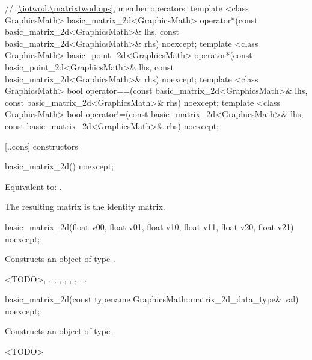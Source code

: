 \begin{codeblock}
{  // \ref{\iotwod.\matrixtwod.ops}, member operators:
  template <class GraphicsMath>
  basic_matrix_2d<GraphicsMath> operator*(const basic_matrix_2d<GraphicsMath>& lhs,
    const basic_matrix_2d<GraphicsMath>& rhs) noexcept;
  template <class GraphicsMath>
  basic_point_2d<GraphicsMath> operator*(const basic_point_2d<GraphicsMath>& lhs,
    const basic_matrix_2d<GraphicsMath>& rhs) noexcept;
  template <class GraphicsMath>
  bool operator==(const basic_matrix_2d<GraphicsMath>& lhs,
    const basic_matrix_2d<GraphicsMath>& rhs) noexcept;
  template <class GraphicsMath>
  bool operator!=(const basic_matrix_2d<GraphicsMath>& lhs,
    const basic_matrix_2d<GraphicsMath>& rhs) noexcept;
}
\end{codeblock}

 [\iotwod.\matrixtwod.cons] { constructors}

%
\begin{itemdecl}
basic_matrix_2d() noexcept;
\end{itemdecl}
\begin{itemdescr}
\pnum
\effects
Equivalent to: .

\pnum
\begin{note}
The resulting matrix is the identity matrix.
\end{note}
\end{itemdescr}

%
\begin{itemdecl}
basic_matrix_2d(float v00, float v01, float v10, float v11,
  float v20, float v21) noexcept;
\end{itemdecl}
\begin{itemdescr}
\pnum
\effects
Constructs an object of type .

\pnum
<TODO>, , , , , , , , .
\end{itemdescr}

%
\begin{itemdecl}
basic_matrix_2d(const typename GraphicsMath::matrix_2d_data_type& val) noexcept;
\end{itemdecl}
\begin{itemdescr}
\pnum
\effects
Constructs an object of type .
	
\pnum
<TODO>
\end{itemdescr}

